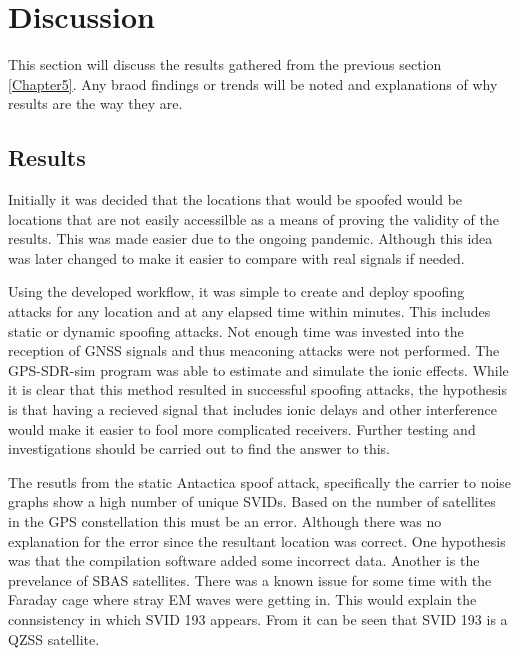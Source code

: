 
\chapter{Discussion} %

\label{Chapter6} %
This section will discuss the results gathered from the previous section \ref{Chapter5}. Any braod findings or trends will be noted and explanations of why results are
the way they are.


\section{Results}
Initially it was decided that the locations that would be spoofed would be locations that are not easily accessilble as a means of proving the validity of the results.
This was made easier due to the ongoing pandemic. Although this idea was later changed to make it easier to compare with real signals if needed.

Using the developed workflow, it was simple to create and deploy spoofing attacks for any location and at any elapsed time within minutes. This includes static or dynamic
spoofing attacks. Not enough time was invested into the reception of GNSS signals and thus meaconing attacks were not performed. The GPS-SDR-sim program was able to
estimate and simulate the ionic effects. While it is clear that this method resulted in successful spoofing attacks, the hypothesis is that having a recieved signal that includes ionic delays
and other interference would make it easier to fool more complicated receivers. Further testing and investigations should be carried out to find the answer to this. 

The resutls from the static Antactica spoof attack, specifically the carrier to noise graphs show a high number of unique SVIDs. Based on the number of satellites in the
GPS constellation this must be an error. Although there was no explanation for the error since the resultant location was correct. One hypothesis was that the compilation
software added some incorrect data. Another is the prevelance of SBAS satellites. There was a known issue for some time with the Faraday cage where stray EM waves were
getting in. This would explain the connsistency in which SVID 193 appears. From  it can be seen that SVID 193 is a QZSS satellite.

